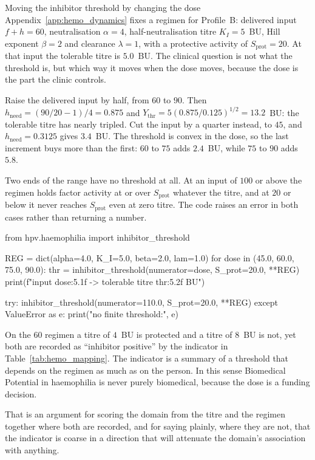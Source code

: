\begin{workedexample}{Moving the inhibitor threshold by changing the dose}
Appendix~\ref{app:hemo_dynamics} fixes a regimen for Profile~B: delivered input
$f+h=60$, neutralisation $\alpha=4$, half-neutralisation titre $K_I=5$~BU,
Hill exponent $\beta=2$ and clearance $\lambda=1$, with a protective activity
of $S_{\text{prot}}=20$. At that input the tolerable titre is $5.0$~BU. The
clinical question is not what the threshold is, but which way it moves when the
dose moves, because the dose is the part the clinic controls.

Raise the delivered input by half, from $60$ to $90$. Then
$h_{\text{need}}=(90/20-1)/4=0.875$ and
$Y_{\text{thr}}=5(0.875/0.125)^{1/2}=13.2$~BU: the tolerable titre has nearly
tripled. Cut the input by a quarter instead, to $45$, and
$h_{\text{need}}=0.3125$ gives $3.4$~BU. The threshold is convex in the dose,
so the last increment buys more than the first: $60$ to $75$ adds $2.4$~BU,
while $75$ to $90$ adds $5.8$.

Two ends of the range have no threshold at all. At an input of $100$ or above
the regimen holds factor activity at or over $S_{\text{prot}}$ whatever the titre, and at
$20$ or below it never reaches $S_{\text{prot}}$ even at zero titre. The code
raises an error in both cases rather than returning a number.

\begin{wecode}[Python]
from hpv.haemophilia import inhibitor_threshold

REG = dict(alpha=4.0, K_I=5.0, beta=2.0, lam=1.0)
for dose in (45.0, 60.0, 75.0, 90.0):
    thr = inhibitor_threshold(numerator=dose, S_prot=20.0, **REG)
    print(f"input {dose:5.1f} -> tolerable titre {thr:5.2f} BU")

try:
    inhibitor_threshold(numerator=110.0, S_prot=20.0, **REG)
except ValueError as e:
    print("no finite threshold:", e)
\end{wecode}

\end{workedexample}

\begin{reading}
On the $60$ regimen a titre of $4$~BU is protected and a titre of $8$~BU is
not, yet both are recorded as ``inhibitor positive'' by the indicator in
Table~\ref{tab:hemo_mapping}. The indicator is a summary of a threshold that
depends on the regimen as much as on the person. In this sense Biomedical
Potential in haemophilia is never purely biomedical, because the dose is a
funding decision.

That is an argument for scoring the domain from the titre and the regimen
together where both are recorded, and for saying plainly, where they are not,
that the indicator is coarse in a direction that will attenuate the domain's
association with anything.
\end{reading}

